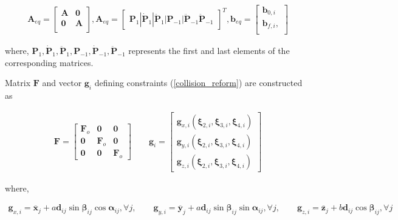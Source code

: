 \begin{align}
    \textbf{A}_{eq} = \begin{bmatrix}
    \textbf{A} & \textbf{0}\\
    \textbf{0} & \textbf{A}\\
    \end{bmatrix}, \textbf{A}_{eq} = \begin{bmatrix}
    \textbf{P}_1|\dot{\textbf{P}}_1| \ddot{\textbf{P}}_1| \textbf{P}_{-1}|\ddot{\textbf{P}}_{-1} \ddot{\textbf{P}}_ {-1}
    \end{bmatrix}^T, \textbf{b}_{eq} = \begin{bmatrix}
    \textbf{b}_{0, i}\\
    \textbf{b}_{f, i},\\
    \end{bmatrix}
\end{align}

\noindent where, $\textbf{P}_{1}, \dot{\textbf{P}}_{1}, \ddot{\textbf{P}}_{1}, \textbf{P}_{-1}, \dot{\textbf{P}}_{-1}, \ddot{\textbf{P}}_{-1}$ represents the first and last elements of the corresponding matrices.

\noindent Matrix $\textbf{F}$ and vector $\textbf{g}_{i}$ defining constraints (\ref{collision_reform}) are constructed as 

\begin{align}
\textbf{F} = \begin{bmatrix} 
\textbf{F}_{o} & \textbf{0} & \textbf{0} \\
 \textbf{0} & \textbf{F}_{o} & \textbf{0} \\
   \textbf{0}  & \textbf{0} & \textbf{F}_{o} 
\end{bmatrix}
\qquad 
\textbf{g}_{i} = 
\begin{bmatrix}
\textbf{g}_{x,{i}}(\boldsymbol{\xi}_{2,i}, \boldsymbol{\xi}_{3,i}, \boldsymbol{\xi}_{4,i}) \\
\textbf{g}_{y,{i}}(\boldsymbol{\xi}_{2,i}, \boldsymbol{\xi}_{3,i}, \boldsymbol{\xi}_{4,i}) \\
\textbf{g}_{z,{i}}(\boldsymbol{\xi}_{2,i}, \boldsymbol{\xi}_{3,i}, \boldsymbol{\xi}_{4,i})
\end{bmatrix}
\label{f_g_matrix}
\end{align}

\noindent where,

\begin{align}
\textbf{g}_{x,{i}} =
\overline{\textbf{x}}_{j} 
+ a
\textbf{d}_{ij} \sin{\boldsymbol{\beta}_{ij}}\cos{\boldsymbol{\alpha}_{ij}}, \forall j
 , \qquad
\textbf{g}_{y,{i}}=
\overline{\textbf{y}}_{j} + a \textbf{d}_{ij}\sin{\boldsymbol{\beta}_{ij}}\sin{\boldsymbol{\alpha}_{ij}} , \forall j,
\qquad
\textbf{g}_{z, i}=
\overline{\textbf{z}}_{j} + b \textbf{d}_{ij}\cos{\boldsymbol{\beta}_{ij}}, \forall j
\end{align}

